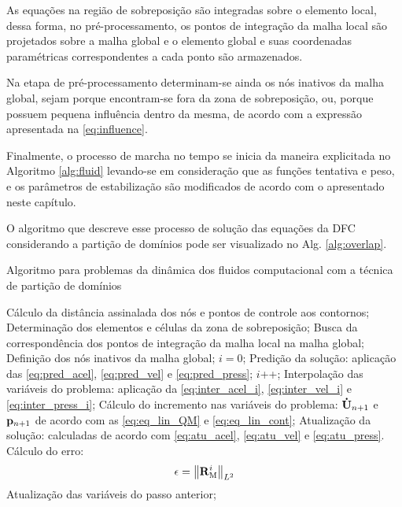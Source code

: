 As equações na região de sobreposição são integradas sobre o elemento local, dessa forma, no pré-processamento, os pontos de integração da malha local são projetados sobre a malha global e o elemento global e suas coordenadas paramétricas correspondentes a cada ponto são armazenados. 

Na etapa de pré-processamento determinam-se ainda os nós inativos da malha global, sejam porque encontram-se fora da zona de sobreposição, ou, porque possuem pequena influência dentro da mesma, de acordo com a expressão apresentada na \autoref{eq:influence}.

Finalmente, o processo de marcha no tempo se inicia da maneira explicitada no Algoritmo \ref{alg:fluid} levando-se em consideração que as funções tentativa e peso, e os parâmetros de estabilização são modificados de acordo com o apresentado neste capítulo.

O algoritmo que descreve esse processo de solução das equações da DFC considerando a partição de domínios pode ser visualizado no Alg. \ref{alg:overlap}.

\begin{algorithm}
	\caption{Algoritmo para problemas da dinâmica dos fluidos computacional com a técnica de partição de domínios}
	\label{alg:overlap}
	\begin{algorithmic}[1]
		\State Cálculo da distância assinalada dos nós e pontos de controle aos contornos;
		\State Determinação dos elementos e células da zona de sobreposição;
		\State Busca da correspondência dos pontos de integração da malha local na malha global;
		\State Definição dos nós inativos da malha global;
		\State $i=0$;
		\State Predição da solução: aplicação das \autoref{eq:pred_acel}, \autoref{eq:pred_vel} e \autoref{eq:pred_press};
		\State $i$++;
		\State Interpolação das variáveis do problema: aplicação da \autoref{eq:inter_acel_i}, \autoref {eq:inter_vel_i} e \autoref{eq:inter_press_i};
		\State Cálculo do incremento nas variáveis do problema: $\mathbf{\dot{U}}_{n+1}$ e $\mathbf{p}_{n+1}$ de acordo com as \autoref{eq:eq_lin_QM} e \autoref{eq:eq_lin_cont};
		\State Atualização da solução: calculadas de acordo com \autoref{eq:atu_acel}, \autoref{eq:atu_vel} e \autoref{eq:atu_press}.
		\State Cálculo do erro:
		\begin{align}
			\epsilon =\left\| \mathbf{R}_\mathrm{M}^i \right\|_{L^2}
		\end{align}
		\EndWhile
		\State Atualização das variáveis do passo anterior;
		\EndFor
	\end{algorithmic}
\end{algorithm}

